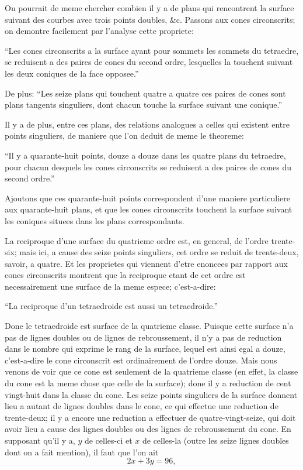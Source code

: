 \documentclass[11pt,a4paper]{book}
\begin{document}
On pourrait de meme chercher combien il y a de plans qui rencontrent la surface suivant des courbes avec trois points doubles, \&c. Passons aux cones circonscrits; on demontre facilement par l'analyse cette propriete:

``Les cones circonscrits a la surface ayant pour sommets les sommets du tetraedre, se reduisent a des paires de cones du second ordre, lesquelles la touchent suivant les deux coniques de la face opposee.''

De plus: ``Les seize plans qui touchent quatre a quatre ces paires de cones sont plans tangents singuliers, dont chacun touche la surface suivant une conique.''

Il y a de plus, entre ces plans, des relations analogues a celles qui existent entre points singuliers, de maniere que l'on deduit de meme le theoreme:

``Il y a quarante-huit points, douze a douze dans les quatre plans du tetraedre, pour chacun desquels les cones circonscrits se reduisent a des paires de cones du second ordre.''

Ajoutons que ces quarante-huit points correspondent d'une maniere particuliere aux quarante-huit plans, et que les cones circonscrits touchent la surface suivant les coniques situees dans les plans correspondants.

La reciproque d'une surface du quatrieme ordre est, en general, de l'ordre trente-six; mais ici, a cause des seize points singuliers, cet ordre se reduit de trente-deux, savoir, a quatre. Et les proprietes qui viennent d'etre enoncees par rapport aux cones circonscrits montrent que la reciproque etant de cet ordre est necessairement une surface de la meme espece; c'est-a-dire:

``La reciproque d'un tetraedroide est aussi un tetraedroide.''

Done le tetraedroide est surface de la quatrieme classe. Puisque cette surface n'a pas de lignes doubles ou de lignes de rebroussement, il n'y a pas de reduction dans le nombre qui exprime le rang de la surface, lequel est ainsi egal a douze, c'est-a-dire le cone circonscrit est ordinairement de l'ordre douze. Mais nous venons de voir que ce cone est seulement de la quatrieme classe (en effet, la classe du cone est la meme chose que celle de la surface); done il y a reduction de cent vingt-huit dans la classe du cone. Les seize points singuliers de la surface donnent lieu a autant de lignes doubles dans le cone, ce qui effectue une reduction de trente-deux; il y a encore une reduction a effectuer de quatre-vingt-seize, qui doit avoir lieu a cause des lignes doubles ou des lignes de rebroussement du cone. En supposant qu'il y a, $y$ de celles-ci et $x$ de celles-la (outre les seize lignes doubles dont on a fait mention), il faut que l'on ait
\[
2x + 3y = 96,
\]
\end{document}
